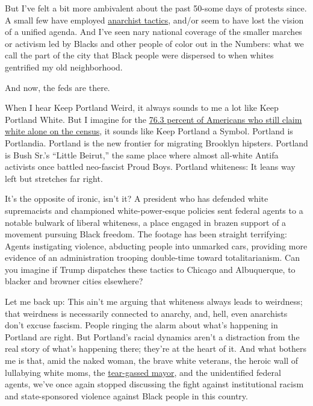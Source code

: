 But I've felt a bit more ambivalent about the past 50-some days of
protests since. A small few have employed
\href{https://abcnews.go.com/US/wireStory/portland-oregon-protest-turns-violent-arrested-71594643}{anarchist
tactics}, and/or seem to have lost the vision of a unified agenda. And
I've seen nary national coverage of the smaller marches or activism led
by Blacks and other people of color out in the Numbers: what we call the
part of the city that Black people were dispersed to when whites
gentrified my old neighborhood.

And now, the feds are there.

When I hear Keep Portland Weird, it always sounds to me a lot like Keep
Portland White. But I imagine for the
\href{https://www.census.gov/quickfacts/fact/table/US/PST045219}{76.3
percent of Americans who still claim white alone on the census}, it
sounds like Keep Portland a Symbol. Portland is Portlandia. Portland is
the new frontier for migrating Brooklyn hipsters. Portland is Bush Sr.'s
``Little Beirut,'' the same place where almost all-white Antifa
activists once battled neo-fascist Proud Boys. Portland whiteness: It
leans way left but stretches far right.

It's the opposite of ironic, isn't it? A president who has defended
white supremacists and championed white-power-esque policies sent
federal agents to a notable bulwark of liberal whiteness, a place
engaged in brazen support of a movement pursuing Black freedom. The
footage has been straight terrifying: Agents instigating violence,
abducting people into unmarked cars, providing more evidence of an
administration trooping double-time toward totalitarianism. Can you
imagine if Trump dispatches these tactics to Chicago and Albuquerque, to
blacker and browner cities elsewhere?

Let me back up: This ain't me arguing that whiteness always leads to
weirdness; that weirdness is necessarily connected to anarchy, and,
hell, even anarchists don't excuse fascism. People ringing the alarm
about what's happening in Portland are right. But Portland's racial
dynamics aren't a distraction from the real story of what's happening
there; they're at the heart of it. And what bothers me is that, amid the
naked woman, the brave white veterans, the heroic wall of lullabying
white moms, the
\href{https://www.nytimes.com/2020/07/23/us/portland-protest-tear-gas-mayor.html}{tear-gassed
mayor}, and the unidentified federal agents, we've once again stopped
discussing the fight against institutional racism and state-sponsored
violence against Black people in this country.

